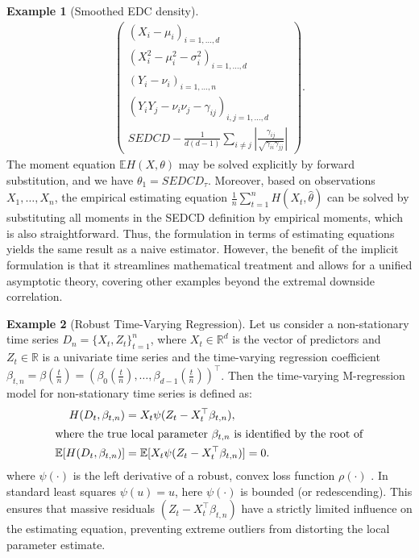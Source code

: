 \documentclass[12pt,a4paper]{article}
\theoremstyle{definition}
\newtheorem{example}{Example}[section]
\theoremstyle{definition}
\theoremstyle{theorem}
\newcommand{\E}{\mathbb{E}}
\begin{document}
\begin{example}[Smoothed EDC density]
\begin{align*}
\begin{pmatrix}
            (X_i-\mu_i)_{i=1,\ldots, d}\\
            (X_i^2-\mu_i^2-\sigma_i^2)_{i=1,\ldots, d} \\
            (Y_i-\nu_i)_{i=1,\ldots, n}\\
            (Y_iY_j-\nu_i\nu_j-\gamma_{ij})_{i,j=1,\ldots, d}\\
            SEDCD - \frac{1}{d(d-1)} \sum_{i\neq j} \left|\frac{\gamma_{ij}}{\sqrt{\gamma_{ii}\gamma_{jj}}}\right|
        \end{pmatrix}.
    \end{align*}
    The moment equation $\E H(X,\theta)$ may be solved explicitly by forward substitution, and we have $\theta_{1}=SEDCD_\tau$. Moreover, based on observations $X_1,\ldots, X_n$, the empirical estimating equation $\frac{1}{n}\sum_{t=1}^n H(X_t,\widehat{\theta})$ can be solved by substituting all moments in the SEDCD definition by empirical moments, which is also straightforward. 
    Thus, the formulation in terms of estimating equations yields the same result as a naive estimator.
    However, the benefit of the implicit formulation is that it streamlines mathematical treatment and allows for a unified asymptotic theory, covering other examples beyond the extremal downside correlation.
\end{example}


\begin{example}[Robust Time-Varying Regression]
\label{ex : robtv}
    Let us consider a non-stationary time series $D_n = \{ X_t, Z_t \}_{t = 1}^n$, where $X_t \in \mathbb{R}^d$ is the vector of predictors and $Z_t \in \mathbb{R}$ is a univariate time series  and the time-varying regression coefficient $\beta_{t,n} = \beta(\frac{t}{n}) = (\beta_0(\frac{t}{n}), \dots, \beta_{d-1}(\frac{t}{n}))^\top$.
    Then the time-varying M-regression model for non-stationary time series is defined as:
\begin{align*}
    H(D_t, \beta_{t,n}) &= X_t \psi(Z_t - X_t^\top \beta_{t,n}), \\
\intertext{where the true local parameter $\beta_{t,n}$ is identified by the root of}
    \mathbb{E}[H(D_t, \beta_{t,n})] &= \mathbb{E}[X_t \psi(Z_t - X_t^\top \beta_{t,n})] = 0.
\end{align*}
where $\psi(\cdot)$ is the left derivative of a robust, convex loss function $\rho(\cdot)$ \citep{huber1964robust,huber1973robust}. In
standard least squares  $\psi(u) = u$, here $\psi(\cdot)$ is bounded (or redescending). This ensures that massive residuals $(Z_t - X_t^\top \beta_{t,n})$ have a strictly limited influence on the estimating equation, preventing extreme outliers from distorting the local parameter estimate.
\end{example}
\end{document}
